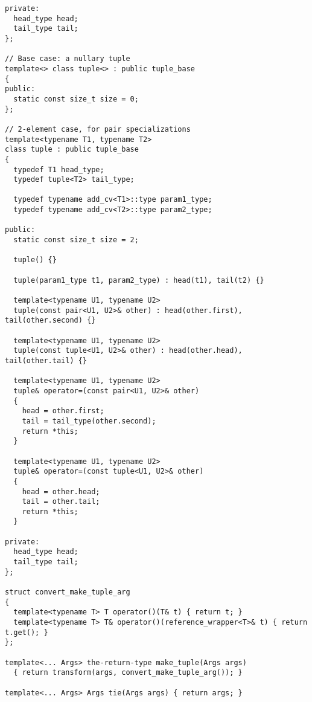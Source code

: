 \documentclass{article}
\begin{document}
\begin{verbatim}
private:
  head_type head;
  tail_type tail;
};

// Base case: a nullary tuple
template<> class tuple<> : public tuple_base 
{
public:
  static const size_t size = 0;
};

// 2-element case, for pair specializations
template<typename T1, typename T2>
class tuple : public tuple_base 
{
  typedef T1 head_type;
  typedef tuple<T2> tail_type;

  typedef typename add_cv<T1>::type param1_type;
  typedef typename add_cv<T2>::type param2_type;

public:
  static const size_t size = 2;

  tuple() {}

  tuple(param1_type t1, param2_type) : head(t1), tail(t2) {}

  template<typename U1, typename U2>
  tuple(const pair<U1, U2>& other) : head(other.first), tail(other.second) {}

  template<typename U1, typename U2>
  tuple(const tuple<U1, U2>& other) : head(other.head), tail(other.tail) {}

  template<typename U1, typename U2>
  tuple& operator=(const pair<U1, U2>& other)
  {
    head = other.first;
    tail = tail_type(other.second);
    return *this;
  }

  template<typename U1, typename U2>
  tuple& operator=(const tuple<U1, U2>& other)
  {
    head = other.head;
    tail = other.tail;
    return *this;
  }

private:
  head_type head;
  tail_type tail;
};

struct convert_make_tuple_arg
{
  template<typename T> T operator()(T& t) { return t; }
  template<typename T> T& operator()(reference_wrapper<T>& t) { return t.get(); }
};

template<... Args> the-return-type make_tuple(Args args)
  { return transform(args, convert_make_tuple_arg()); }

template<... Args> Args tie(Args args) { return args; }
\end{verbatim}
\normalsize
\end{document}
